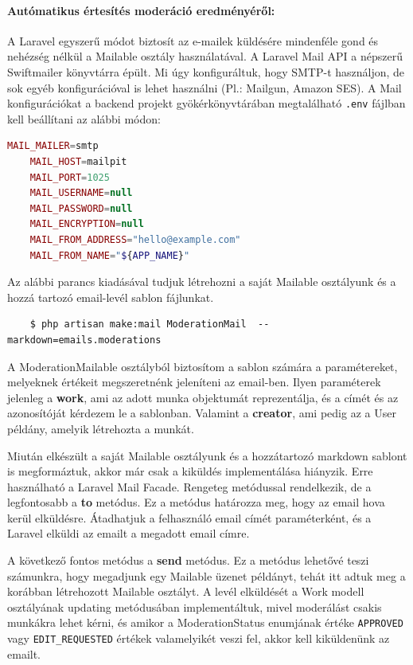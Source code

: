 \paragraph{Autómatikus értesítés moderáció eredményéről:}
A Laravel egyszerű módot biztosít az e-mailek küldésére mindenféle gond és nehézség nélkül a Mailable osztály használatával.
A Laravel Mail API a népszerű Swiftmailer könyvtárra épült. Mi úgy konfiguráltuk, hogy SMTP-t használjon, de sok egyéb konfigurációval is lehet használni (Pl.: Mailgun, Amazon SES).
A Mail konfigurációkat a backend projekt gyökérkönyvtárában megtalálható \texttt{.env} fájlban kell beállítani az alábbi módon:


\begin{lstlisting}[language=php]
    MAIL_MAILER=smtp
    MAIL_HOST=mailpit
    MAIL_PORT=1025
    MAIL_USERNAME=null
    MAIL_PASSWORD=null
    MAIL_ENCRYPTION=null
    MAIL_FROM_ADDRESS="hello@example.com"
    MAIL_FROM_NAME="${APP_NAME}"
\end{lstlisting}
Az alábbi parancs kiadásával tudjuk létrehozni a saját Mailable osztályunk és a hozzá tartozó email-levél sablon fájlunkat.
\begin{center}
   \begin{verbatim}
    $ php artisan make:mail ModerationMail  --markdown=emails.moderations
    \end{verbatim}
\end{center}

A ModerationMailable osztályból biztosítom a sablon számára a paramétereket, melyeknek értékeit megszeretnénk jeleníteni az email-ben. Ilyen paraméterek jelenleg a \textbf{work}, ami az adott munka objektumát reprezentálja, és a címét és az azonosítóját kérdezem le a sablonban. Valamint a \textbf{creator}, ami pedig az a User példány, amelyik létrehozta a munkát.

Miután elkészült a saját Mailable osztályunk és a hozzátartozó markdown sablont is megformáztuk, akkor már csak a kiküldés implementálása hiányzik. Erre használható a Laravel Mail Facade. Rengeteg metódussal rendelkezik, de a legfontosabb a \textbf{to} metódus. Ez a metódus határozza meg, hogy az email hova kerül elküldésre. Átadhatjuk a felhasználó email címét paraméterként, és a Laravel elküldi az emailt a megadott email címre. 

A következő fontos metódus a \textbf{send} metódus. Ez a metódus lehetővé teszi számunkra, hogy megadjunk egy Mailable üzenet példányt, tehát itt adtuk meg a korábban létrehozott Mailable osztályt.
A levél elküldését a Work modell osztályának updating metódusában implementáltuk, mivel moderálást csakis munkákra lehet kérni, és amikor a ModerationStatus enumjának értéke \texttt{APPROVED} vagy \texttt{EDIT\_REQUESTED} értékek valamelyikét veszi fel, akkor kell kiküldenünk az emailt.

